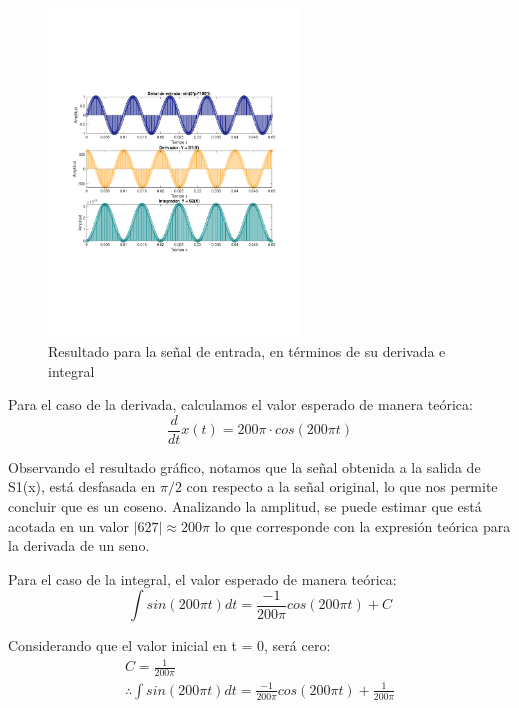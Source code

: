		\begin{figure}[H]
			\center
			\includegraphics[width=0.6\textwidth,clip, trim = {2cm 7.0cm 2.2cm 7.0cm}]{../imgs/3_b.pdf}
			\caption{Resultado para la señal de entrada, en términos de su derivada e integral}
			\label{fig:3_b}
		\end{figure}
		
		Para el caso de la derivada, calculamos el valor esperado de manera teórica:
		\begin{equation}
			\frac{d}{dt}x(t) = 200\pi \cdot cos(200\pi t)
		\end{equation}
		
		Observando el resultado gráfico, notamos que la señal obtenida a la salida de S1(x), está desfasada en $\pi/2$ con respecto a la señal original, lo que nos permite concluir que es un coseno. Analizando la amplitud, se puede estimar que está acotada en un valor $|627| \approx 200\pi$ lo que corresponde con la expresión teórica para la derivada de un seno. 
		
		Para el caso de la integral, el valor esperado de manera teórica:
		\begin{equation}
			\int sin(200\pi t) dt = \frac{-1}{200\pi} cos(200\pi t) + C
		\end{equation}
		
		Considerando que el valor inicial en t = 0, será cero:
		\begin{align}
			C = \frac{1}{200\pi} \\
			\therefore \int sin(200\pi t) dt = \frac{-1}{200\pi} cos(200\pi t) + \frac{1}{200 \pi}
		\end{align}
		
